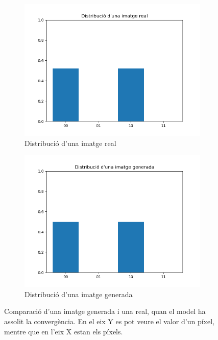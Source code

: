 \begin{figure}[H]
	\begin{subfigure}{0.51\textwidth}
		\includegraphics[width=\linewidth]{figures/model/real_distribution.png}
		\caption{Distribució d'una imatge real} \label{fig:1a}
	\end{subfigure}%
	\hspace*{\fill}   %
	\begin{subfigure}{0.51\textwidth}
		\includegraphics[width=\linewidth]{figures/model/fake_distribution.png}
		\caption{Distribució d'una imatge generada} \label{fig:1b}
	\end{subfigure}%
	\hspace*{\fill}
	\caption{Comparació d'una imatge generada i una real, quan el model ha assolit la convergència. En el eix Y es pot veure el valor d'un píxel, mentre que en l'eix X estan els píxels. }
	\label{fig:comp_imatge} 
\end{figure}


